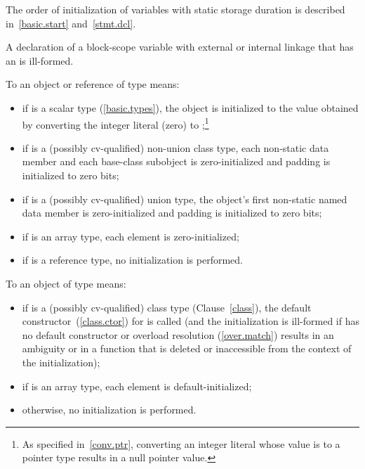 \pnum
The order of initialization of variables with static storage duration is described in~\ref{basic.start}
and~\ref{stmt.dcl}.
\exitnote

\pnum
A declaration of a block-scope variable with external or internal
linkage that has an  is ill-formed.

\pnum
{}%
%
%
%
To
an object or reference of type
means:

\begin{itemize}
\item
if
is a scalar type (\ref{basic.types}), the
object
is initialized to the value obtained by converting the integer literal 
(zero) to
;\footnote{As specified in~\ref{conv.ptr}, converting an integer
literal whose value is
to a pointer type results in a null pointer value.
}

\item
if
is a (possibly cv-qualified) non-union class type,
each non-static data member and each
base-class subobject is zero-initialized and padding is initialized to zero bits;

\item
if
is a (possibly cv-qualified) union type,
the
object's first non-static named
data member
is zero-initialized and padding is initialized to zero bits;

\item
if
is an array type,
each element is zero-initialized;
\item
if
is a reference type, no initialization is performed.
\end{itemize}

\pnum
{}%
To
an object of type
means:

\begin{itemize}
\item
if
is a (possibly cv-qualified) class type (Clause~\ref{class}), the default
constructor~(\ref{class.ctor}) for
is called (and the initialization is ill-formed if
has no default constructor or overload resolution (\ref{over.match}) results
in an ambiguity or in a function that is deleted or inaccessible from the
context of the initialization);

\item
if
is an array type, each element is default-initialized;

\item
otherwise,
no initialization is performed.
\end{itemize}

